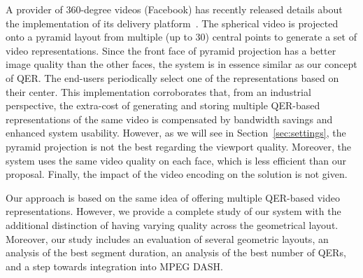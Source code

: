 A  provider of $360$-degree videos (Facebook) has recently
released details about the implementation of its delivery
platform~\cite{facebook}.
The spherical video is projected onto a pyramid layout from multiple
(up to $30$) central points to generate a set of video representations.
Since the
front face of pyramid projection has a better image quality than the other faces, the
system is in essence similar as our concept of \ac{QER}. The end-users
periodically select one of the representations
based on their \FoV{} center. This implementation
corroborates that, from an industrial perspective, the extra-cost of
generating and storing multiple \ac{QER}-based representations of the
same video is compensated by bandwidth savings and
enhanced system usability.
However, as we will see in Section~\ref{sec:settings}, the pyramid projection is not
the best regarding the viewport quality. Moreover, the system
uses the same video quality on each face, which is less
efficient than our proposal. Finally, the impact of the video encoding on the solution
is not given.

Our approach is based on the same
idea of offering multiple \ac{QER}-based video representations.
However, we provide a complete study of our system with the additional
distinction of having varying quality across the geometrical layout. Moreover,
our study includes an evaluation of several
geometric layouts, an analysis of the best segment duration, an
analysis of the best number of \acp{QER},
and a step towards integration into \ac{MPEG} \ac{DASH}.
